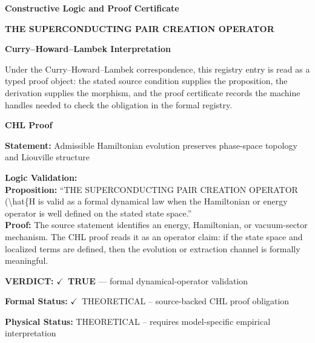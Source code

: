\clearpage
\begingroup\tzpsupportsetup
\noindent\textbf{\fontsize{10.8pt}{12.8pt}\selectfont [ID 0593] Constructive Logic and Proof Certificate}\par
\noindent\textbf{\fontsize{10pt}{12pt}\selectfont THE SUPERCONDUCTING PAIR CREATION OPERATOR}\par
\vspace{0.45em}
\begingroup
\footnotesize
\setlength{\parskip}{0.22em}
\setlength{\parindent}{0pt}
\noindent\textbf{Curry--Howard--Lambek Interpretation}\par
Under the Curry--Howard--Lambek correspondence, this registry entry is read as a typed proof
object: the stated source condition supplies the proposition, the derivation supplies the
morphism, and the proof certificate records the machine handles needed to check the obligation
in the formal registry.

\vspace{0.45em}
\noindent\textbf{CHL Proof}\par
\textbf{Statement:} Admissible Hamiltonian evolution preserves phase-space topology and Liouville structure

\textbf{Logic Validation:}\\
\textbf{Proposition:} ``THE SUPERCONDUCTING PAIR CREATION OPERATOR (\textbackslash{}hat\{H is valid as a formal dynamical law
when the Hamiltonian or energy operator is well defined on the stated state space.''\\
\textbf{Proof:} The source statement identifies an energy, Hamiltonian, or vacuum-sector mechanism. The
CHL proof reads it as an operator claim: if the state space and localized terms are
defined, then the evolution or extraction channel is formally meaningful.

\textbf{VERDICT:} \ensuremath{\checkmark}\ \textbf{TRUE} --- formal dynamical-operator validation

\textbf{Formal Status:} \ensuremath{\checkmark}\ THEORETICAL -- source-backed CHL proof obligation

\textbf{Physical Status:} THEORETICAL -- requires model-specific empirical interpretation
\par\vspace{0.45em}
\par
\ifTZPDarkEdition
{}
\fi
\endgroup
\endgroup
